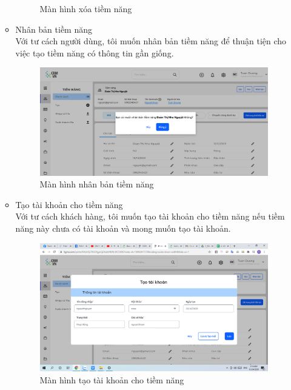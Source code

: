 \documentclass[12pt,a4paper]{article}
\begin{document}
\begin{enumerate}
\begin{itemize}
\begin{figure}[H]
                \vspace{0.5cm}
                \caption{Màn hình xóa tiềm năng}
                \label{xoatiemnang}
            \end{figure}
            \item Nhân bản tiềm năng \\
            Với tư cách người dùng, tôi muốn nhân bản tiềm năng để thuận tiện cho việc tạo tiềm năng có thông tin gần giống.
            \begin{figure}[H]
                \centering \includegraphics[width=\textwidth]{Img/Nguyet/nhanban.png}
                \vspace{0.5cm}
                \caption{Màn hình nhân bản tiềm năng}
                \label{nhanbantiemnang}
            \end{figure}
            \item Tạo tài khoản cho tiềm năng \\
            Với tư cách khách hàng, tôi muốn tạo tài khoản cho tiềm năng nếu tiềm năng này chưa có tài khoản và mong muốn tạo tài khoản.
            \begin{figure}[H]
                \centering \includegraphics[width=\textwidth]{Img/Nguyet/taotktm.png}
                \vspace{0.5cm}
                \caption{Màn hình tạo tài khoản cho tiềm năng}
                \label{taotktiemnang}
            \end{figure}


\end{itemize}
\end{enumerate}
\end{document}
